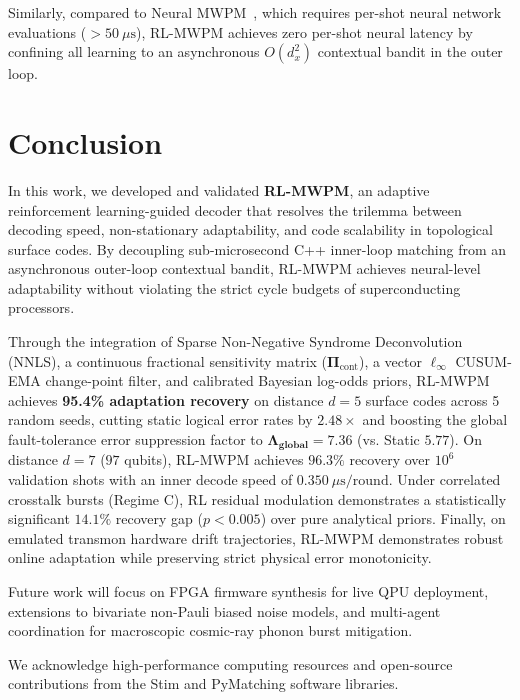 \documentclass[aps,prxquantum,reprint,superscriptaddress,floatfix,nofootinbib]{revtex4-2}
\begin{document}
Similarly, compared to Neural MWPM~\cite{peled2026neural}, which requires per-shot neural network evaluations ($>50\ \mu\text{s}$), RL-MWPM achieves zero per-shot neural latency by confining all learning to an asynchronous $O(d_x^2)$ contextual bandit in the outer loop.

\section{Conclusion}
\label{sec:conclusion}

In this work, we developed and validated \textbf{RL-MWPM}, an adaptive reinforcement learning-guided decoder that resolves the trilemma between decoding speed, non-stationary adaptability, and code scalability in topological surface codes. By decoupling sub-microsecond C++ inner-loop matching from an asynchronous outer-loop contextual bandit, RL-MWPM achieves neural-level adaptability without violating the strict cycle budgets of superconducting processors.

Through the integration of Sparse Non-Negative Syndrome Deconvolution (NNLS), a continuous fractional sensitivity matrix ($\mathbf{\Pi}_{\text{cont}}$), a vector $\ell_\infty$ CUSUM-EMA change-point filter, and calibrated Bayesian log-odds priors, RL-MWPM achieves \textbf{95.4\% adaptation recovery} on distance $d=5$ surface codes across 5 random seeds, cutting static logical error rates by $2.48\times$ and boosting the global fault-tolerance error suppression factor to $\mathbf{\Lambda_{\text{global}} = 7.36}$ (vs. Static $5.77$). On distance $d=7$ ($97$ qubits), RL-MWPM achieves $96.3\%$ recovery over $10^6$ validation shots with an inner decode speed of $0.350\ \mu\text{s}/\text{round}$. Under correlated crosstalk bursts (Regime C), RL residual modulation demonstrates a statistically significant $14.1\%$ recovery gap ($p < 0.005$) over pure analytical priors. Finally, on emulated transmon hardware drift trajectories, RL-MWPM demonstrates robust online adaptation while preserving strict physical error monotonicity.

Future work will focus on FPGA firmware synthesis for live QPU deployment, extensions to bivariate non-Pauli biased noise models, and multi-agent coordination for macroscopic cosmic-ray phonon burst mitigation.

\begin{acknowledgments}
We acknowledge high-performance computing resources and open-source contributions from the Stim and PyMatching software libraries.
\end{acknowledgments}
\end{document}
